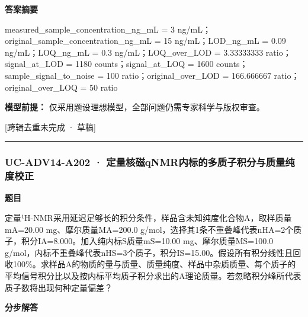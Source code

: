 \documentclass[UTF8,11pt,a4paper]{ctexart}
\begin{document}
\noindent\textbf{答案摘要}\par
measured\_sample\_concentration\_ng\_mL = 3 ng/mL；original\_sample\_concentration\_ng\_mL = 15 ng/mL；LOD\_ng\_mL = 0.09 ng/mL；LOQ\_ng\_mL = 0.3 ng/mL；LOQ\_over\_LOD = 3.33333333 ratio；signal\_at\_LOD = 1180 counts；signal\_at\_LOQ = 1600 counts；sample\_signal\_to\_noise = 100 ratio；original\_over\_LOD = 166.666667 ratio；original\_over\_LOQ = 50 ratio\par
\noindent\textbf{模型前提：}
仅采用题设理想模型，全部问题仍需专家科学与版权审查。\par
\noindent\textcolor{red!65!black}{[跨辑去重未完成 · 草稿]} \par
\medskip\hrule\medskip
{}
\subsubsection*{UC-ADV14-A202 · 定量核磁qNMR内标的多质子积分与质量纯度校正}
\noindent\textbf{题目}\par
定量¹H-NMR采用延迟足够长的积分条件，样品含未知纯度化合物A，取样质量mA=20.00 mg、摩尔质量MA=200.0 g/mol，选择其1条不重叠峰代表nHA=2个质子，积分IA=8.000。加入纯内标S质量mS=10.00 mg、摩尔质量MS=100.0 g/mol，内标不重叠峰代表nHS=3个质子，积分IS=15.00。假设所有积分线性且回收100\%。求样品A的物质的量与质量、质量纯度、样品中杂质质量、每个质子的平均信号积分比以及按内标平均质子积分求出的A理论质量。若忽略积分峰所代表质子数将出现何种定量偏差？\par
\medskip\noindent\textbf{分步解答}
\end{document}

